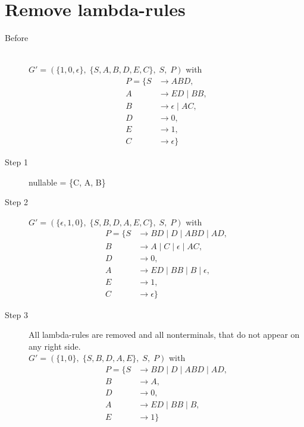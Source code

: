 \documentclass{article}
\begin{document}
\section{Remove lambda-rules}
\begin{description}
	\item[Before] \hfill \\ 
	$G'=\left(\{	1, 0, \epsilon\},\;\{ S, A, B, D, E, C\},\;S,\;P\right)$ with
	\begin{align*}
		P=\{	S &\rightarrow ABD, \\ 
		A &\rightarrow ED\;|\;BB, \\ 
		B &\rightarrow \epsilon\;|\;AC, \\ 
		D &\rightarrow 0, \\ 
		E &\rightarrow 1, \\ 
		C &\rightarrow \epsilon\}
	\end{align*}
	\item[Step 1] nullable = \{C, A, B\}
	\item[Step 2]
	$G'=\left(\{	\epsilon, 1, 0\},\;\{ S, B, D, A, E, C\},\;S,\;P\right)$ with
	\begin{align*}
		P=\{	S &\rightarrow BD\;|\;D\;|\;ABD\;|\;AD, \\ 
		B &\rightarrow A\;|\;C\;|\;\epsilon\;|\;AC, \\ 
		D &\rightarrow 0, \\ 
		A &\rightarrow ED\;|\;BB\;|\;B\;|\;\epsilon, \\ 
		E &\rightarrow 1, \\ 
		C &\rightarrow \epsilon\}
	\end{align*}
	\item[Step 3] All lambda-rules are removed and all nonterminals, that do not appear on any right side. \\ 
	$G'=\left(\{	1, 0\},\;\{ S, B, D, A, E\},\;S,\;P\right)$ with
	\begin{align*}
		P=\{	S &\rightarrow BD\;|\;D\;|\;ABD\;|\;AD, \\ 
		B &\rightarrow A, \\ 
		D &\rightarrow 0, \\ 
		A &\rightarrow ED\;|\;BB\;|\;B, \\ 
		E &\rightarrow 1\}
	\end{align*}
\end{description}
\end{document}
